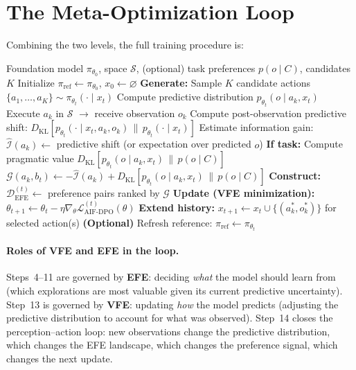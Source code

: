 \documentclass[11pt]{article}
\newcommand{\EFE}{\mathcal{G}}
\newcommand{\KL}[2]{D_{\mathrm{KL}}\!\left[#1 \,\|\, #2\right]}
\begin{document}
\section{The Meta-Optimization Loop}
\label{sec:algorithm}

Combining the two levels, the full training procedure is:

\begin{algorithm}[H]
\caption{AIF-DPO Meta-Optimization}
\label{alg:aif-dpo}
\begin{algorithmic}[1]
\REQUIRE Foundation model $\pi_{\theta_0}$, space $\mathcal{S}$, (optional) task preferences $p(o \mid C)$, candidates $K$
\STATE Initialize $\pi_{\mathrm{ref}} \leftarrow \pi_{\theta_0}$, \; $x_0 \leftarrow \varnothing$
    \STATE \textbf{Generate:} Sample $K$ candidate actions $\{a_1, \ldots, a_K\} \sim \pi_{\theta_t}(\cdot \mid x_t)$
        \STATE Compute predictive distribution $p_{\theta_t}(o \mid a_k, x_t)$
        \STATE Execute $a_k$ in $\mathcal{S}$ $\rightarrow$ receive observation $o_k$
        \STATE Compute post-observation predictive shift: $\KL{p_{\theta_t}(\cdot \mid x_t, a_k, o_k)}{p_{\theta_t}(\cdot \mid x_t)}$
        \STATE Estimate information gain: $\hat{\mathcal{I}}(a_k) \leftarrow$ predictive shift (or expectation over predicted $o$)
        \STATE \textbf{If task:} Compute pragmatic value $\KL{p_{\theta_t}(o \mid a_k, x_t)}{p(o \mid C)}$
        \STATE $\EFE(a_k, b_t) \leftarrow -\hat{\mathcal{I}}(a_k) + \KL{p_{\theta_t}(o \mid a_k, x_t)}{p(o \mid C)}$
    \ENDFOR
    \STATE \textbf{Construct:} $\mathcal{D}_{\mathrm{EFE}}^{(t)} \leftarrow$ preference pairs ranked by $\EFE$
    \STATE \textbf{Update (VFE minimization):} $\theta_{t+1} \leftarrow \theta_t - \eta \nabla_\theta \mathcal{L}_{\mathrm{AIF\text{-}DPO}}^{(t)}(\theta)$
    \STATE \textbf{Extend history:} $x_{t+1} \leftarrow x_t \cup \{(a_k^*, o_k^*)\}$ for selected action(s)
    \STATE \textbf{(Optional)} Refresh reference: $\pi_{\mathrm{ref}} \leftarrow \pi_{\theta_t}$
\ENDFOR
\end{algorithmic}
\end{algorithm}

\paragraph{Roles of VFE and EFE in the loop.}
Steps~4--11 are governed by \textbf{EFE}: deciding \emph{what} the model should learn from (which explorations are most valuable given its current predictive uncertainty). Step~13 is governed by \textbf{VFE}: updating \emph{how} the model predicts (adjusting the predictive distribution to account for what was observed). Step~14 closes the perception--action loop: new observations change the predictive distribution, which changes the EFE landscape, which changes the preference signal, which changes the next update.
\end{document}
